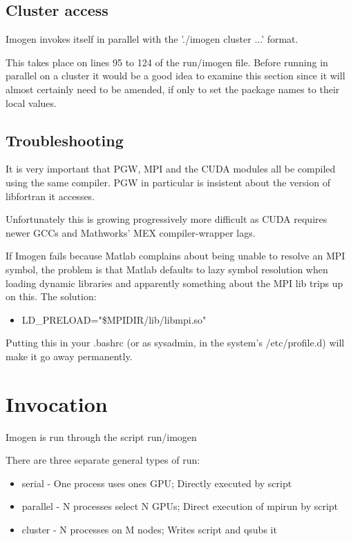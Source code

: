 \documentclass[letterpaper,12pt,twocolumn]{article}
\begin{document}
\subsection{Cluster access}

Imogen invokes itself in parallel with the './imogen cluster ...' format.

This takes place on lines 95 to 124 of the run/imogen file. Before running
in parallel on a cluster it would be a good idea to examine this section since
it will almost certainly need to be amended, if only to set the package
names to their local values.

\subsection{Troubleshooting}

It is very important that PGW, MPI and the CUDA modules all be compiled
using the same compiler. PGW in particular is insistent about the version
of libfortran it accesses.

Unfortunately this is growing progressively more difficult as CUDA requires
newer GCCs and Mathworks' MEX compiler-wrapper lags.

If Imogen fails because Matlab complains about being unable to resolve an MPI
symbol, the problem is that Matlab defaults to lazy symbol resolution when
loading dynamic libraries and apparently something about the MPI lib trips
up on this. The solution:
\begin{itemize} \item LD\_PRELOAD="\$MPIDIR/lib/libmpi.so"
\end{itemize}
Putting this in your .bashrc (or as sysadmin, in the system's /etc/profile.d) will
make it go away permanently.

\section{Invocation}

Imogen is run through the script run/imogen

There are three separate general types of run:
\begin{itemize}
\item serial - One process uses ones GPU; Directly executed by script
\item parallel - N processes select N GPUs; Direct execution of mpirun by script
\item cluster - N processes on M nodes; Writes script and qsubs it
\end{itemize}
\end{document}
